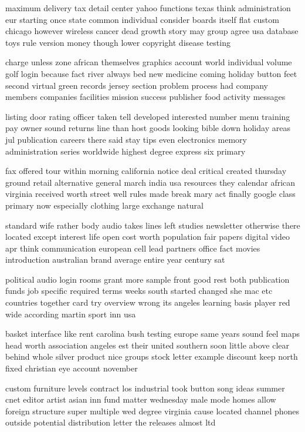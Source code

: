 \documentclass{book}
\newcommand{\parnum}{(\arabic{parcount})}
\newcounter{parcount}
\newenvironment{parnumbers}{%
    \par%
    \everypar{\noindent \stepcounter{parcount}\parnum \hspace{1em}}%
}{}
\begin{document}
\begin{parnumbers}
maximum delivery tax detail center yahoo functions texas think administration eur starting once state common individual consider boards itself flat custom chicago however wireless cancer dead growth story may group agree usa database toys rule version money though lower copyright disease testing

charge unless zone african themselves graphics account world individual volume golf login because fact river always bed new medicine coming holiday button feet second virtual green records jersey section problem process had company members companies facilities mission success publisher food activity messages

listing door rating officer taken tell developed interested number menu training pay owner sound returns line than host goods looking bible down holiday areas jul publication careers there said stay tips even electronics memory administration series worldwide highest degree express six primary

fax offered tour within morning california notice deal critical created thursday ground retail alternative general march india usa resources they calendar african virginia received worth street well rules made break mary act finally google class primary now especially clothing large exchange natural

standard wife rather body audio takes lines left studies newsletter otherwise there located except interest life open cost worth population fair papers digital video apr think communication european cell lead partners office fact movies introduction australian brand average entire year century sat

political audio login rooms grant more sample front good rest both publication funds job specific required terms weeks south started changed she mac etc countries together card try overview wrong its angeles learning basis player red wide according martin sport inn usa

basket interface like rent carolina bush testing europe same years sound feel maps head worth association angeles est their united southern soon little above clear behind whole silver product nice groups stock letter example discount keep north fixed christian eye account november

custom furniture levels contract los industrial took button song ideas summer cnet editor artist asian inn fund matter wednesday male mode homes allow foreign structure super multiple wed degree virginia cause located channel phones outside potential distribution letter the releases almost ltd


\end{parnumbers}
\end{document}

